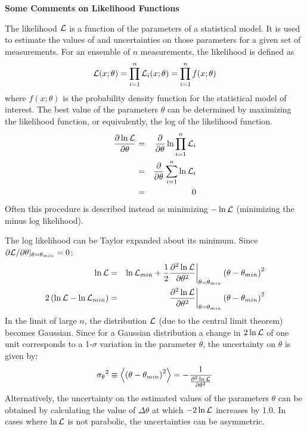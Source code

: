 \documentclass[12pt]{article}
\def\half{{1\over 2}}
\begin{document}
\begin{center}
{\large\bf Some Comments on Likelihood Functions}
\end{center}
\vskip0.2in
The likelihood ${\cal L}$ is a function of the parameters of a statistical model.  It is
used to estimate the values of and uncertainties on those parameters for a given set of measurements.
For an ensemble of  $n$ measurements, the likelihood is defined as
$$
{\cal L}(x;\theta) = \prod_{i=1}^n {\cal L}_i(x;\theta) = \prod_{i=1}^n f(x;\theta)
$$
where $f(x;\theta)$ is the probability density function for the statistical model of interest.
The best value of the parameters $\theta$ can be determined by maximizing the likelihood function,
or equivalently, the log of the likelihood function.
\begin{eqnarray*}
  \frac{\partial \ln {\cal L}}{\partial  \theta} & = & 
  \frac{\partial} {\partial \theta} \ln \prod_{i=1}^n {\cal L}_i   \\
 & = & \frac{\partial}{\partial \theta} \sum_{i=1}^n \ln {\cal L}_i \\
 & = & 0 \\
\end{eqnarray*}
Often this procedure is described instead as minimizing $-\ln {\cal L}$ (minimizing the minus log likelihood).

The log likelihood can be Taylor expanded about its minimum.
Since $\partial {\cal L } /\partial \theta |_{\theta=\theta_{min}}=0$:
\begin{eqnarray*}
  \ln {\cal L} & = & \ln {\cal L}_{min} +\half \frac{\partial^2 \ln {\cal L}}{\partial \theta^2} \bigg|_{\theta=\theta_{min}}
  \left ( \theta -\theta_{min} \right )^2 \\
    2\left (\ln {\cal L} -\ln {\cal L}_{min} \right ) & = &  \frac{\partial^2 \ln {\cal L}}{\partial \theta^2} \bigg|_{\theta=\theta_{min}}
  \left ( \theta -\theta_{min} \right )^2 \\
\end{eqnarray*}
In the limit of large  $n$, the distribution ${\cal L}$  (due to the central limit theorem) becomes Gaussian.
Since for a Gaussian distribution
a change in $2\ln {\cal L}$ of one unit corresponds to a 1-$\sigma$ variation in
the parameter $\theta$,
the uncertainty on $\theta$ is given by:
$$
        {\sigma_\theta}^2 \equiv
        \left < \left ( \theta-\theta_{min} \right )^2 \right >  =  - \frac{1}{\frac{\partial^2 \ln {\cal L}}
  {\partial \theta^2}} \\
$$
Alternatively, the uncertainty
on the estimated values of the parameters $\theta$ can be obtained by calculating the value of
$\Delta \theta$  at which $-2\ln {\cal L}$ increases by 1.0.  In cases where $\ln {\cal L}$ is not
parabolic, the uncertainties can be asymmetric.
\end{document}
